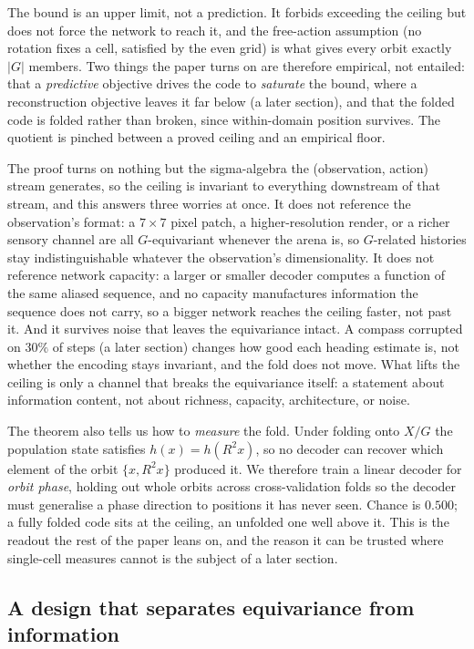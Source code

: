 \documentclass[9pt,lineno]{elife}
\begin{document}
The bound is an upper limit, not a prediction. It forbids exceeding the ceiling but does not force
the network to reach it, and the free-action assumption (no rotation fixes a cell, satisfied by the
even grid) is what gives every orbit exactly $|G|$ members. Two things the paper turns on are
therefore empirical, not entailed: that a \emph{predictive} objective drives the code to
\emph{saturate} the bound, where a reconstruction objective leaves it far below (a later section),
and that the folded code is folded rather than broken, since within-domain position survives. The
quotient is pinched between a proved ceiling and an empirical floor.

The proof turns on nothing but the sigma-algebra the (observation, action) stream generates, so the
ceiling is invariant to everything downstream of that stream, and this answers three worries at once.
It does not reference the observation's format: a $7\times7$ pixel patch, a higher-resolution render,
or a richer sensory channel are all $G$-equivariant whenever the arena is, so $G$-related histories
stay indistinguishable whatever the observation's dimensionality. It does not reference network
capacity: a larger or smaller decoder computes a function of the same aliased sequence, and no
capacity manufactures information the sequence does not carry, so a bigger network reaches the ceiling
faster, not past it. And it survives noise that leaves the equivariance intact. A compass corrupted
on $30\%$ of steps (a later section) changes how good each heading estimate is, not whether the
encoding stays invariant, and the fold does not move. What lifts the ceiling is only a channel that
breaks the equivariance itself: a statement about information content, not about richness, capacity,
architecture, or noise.

The theorem also tells us how to \emph{measure} the fold. Under folding onto $X/G$ the population
state satisfies $h(x) = h(R^2x)$, so no decoder can recover which element of the orbit $\{x, R^2x\}$
produced it. We therefore train a linear decoder for \emph{orbit phase}, holding out whole orbits
across cross-validation folds so the decoder must generalise a phase direction to positions it has
never seen. Chance is $0.500$; a fully folded code sits at the ceiling, an unfolded one well above it.
This is the readout the rest of the paper leans on, and the reason it can be trusted where single-cell
measures cannot is the subject of a later section.

\subsection{A design that separates equivariance from information}
\end{document}
